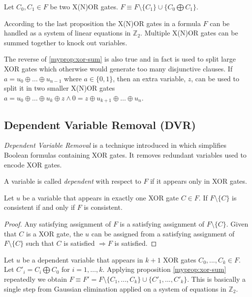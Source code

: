 \begin{myprop}
  \label{myprop:xor-sum}
  Let $C_0, C_1 \in F$ be two X(N)OR gates. $F \equiv F \setminus \{C_1\} \cup
  \{C_0 \bigoplus C_1\}$.
\end{myprop}

According to the last proposition the X(N)OR gates in a
formula $F$ can be handled as a system of linear equations in
$\mathbb{Z}_2$. Multiple X(N)OR gates can be summed together to
knock out variables.

The reverse of \ref{myprop:xor-sum} is also true and in fact is used
to split large XOR gates which otherwise would generate too many
disjunctive clauses. If $a = u_0 \oplus \ldots \oplus u_{n-1}$ where
$a \in \{0, 1\}$, then an extra variable, $z$, can be used to split
it in two smaller X(N)OR gates $a = u_0 \oplus \ldots \oplus u_{k}
\oplus z \land 0 = z \oplus u_{k + 1} \oplus \ldots \oplus u_{n}$.


\subsection{Dependent Variable Removal (DVR)}
\label{ssec:dvr}

\emph{Dependent Variable Removal} is a technique introduced in
\cite{mine:march} which simplifies Boolean formulas containing XOR gates.
It removes redundant variables used to encode XOR gates.

\begin{mydef}
  A variable is called \emph{dependent} with respect to $F$ if it
  appears only in XOR gates.
\end{mydef}

\begin{myprop}[DVR]
  \label{myprop:dvr-single}
  Let $u$ be a variable that appears in exactly one XOR gate $C
  \in F$. If $F \setminus \{C\}$ is consistent if and only if $F$
  is consistent.
\end{myprop}

\begin{proof}
  Any satisfying assignment of $F$ is a satisfying assignment of $F
  \setminus \{ C \}$.  Given that $C$ is a XOR gate, the $u$ can
  be assigned from a satisfying assignment of $F \setminus \{C\}$
  such that $C$ is satisfied $\Rightarrow F$ is satisfied.
\end{proof}


Let $u$ be a dependent variable that appears in $k + 1$ XOR gates
$C_0, ..., C_k \in F$. Let $C'_i = C_i \bigoplus C_0$ for $i = 1,
\ldots, k$.  Applying proposition \ref{myprop:xor-sum} repeatedly we
obtain $F \equiv F' = F \setminus \{C_{1}, ..., C_k\} \cup \{C'_{1},
..., C'_k\}$. This is basically a single step from Gaussian
elimination applied on a system of equations in $\mathbb{Z}_2$.

